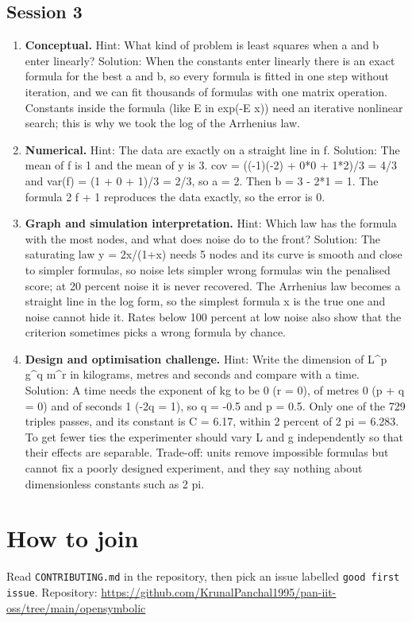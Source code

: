 \documentclass[11pt,a4paper]{article}
\begin{document}
\subsection*{Session 3}
\begin{enumerate}[nosep]
\item \textbf{Conceptual.} Hint: What kind of problem is least squares when a and b enter linearly? Solution: When the constants enter linearly there is an exact formula for the best a and b, so every formula is fitted in one step without iteration, and we can fit thousands of formulas with one matrix operation. Constants inside the formula (like E in exp(-E x)) need an iterative nonlinear search; this is why we took the log of the Arrhenius law.
\item \textbf{Numerical.} Hint: The data are exactly on a straight line in f. Solution: The mean of f is 1 and the mean of y is 3. cov = ((-1)(-2) + 0*0 + 1*2)/3 = 4/3 and var(f) = (1 + 0 + 1)/3 = 2/3, so a = 2. Then b = 3 - 2*1 = 1. The formula 2 f + 1 reproduces the data exactly, so the error is 0.
\item \textbf{Graph and simulation interpretation.} Hint: Which law has the formula with the most nodes, and what does noise do to the front? Solution: The saturating law y = 2x/(1+x) needs 5 nodes and its curve is smooth and close to simpler formulas, so noise lets simpler wrong formulas win the penalised score; at 20 percent noise it is never recovered. The Arrhenius law becomes a straight line in the log form, so the simplest formula x is the true one and noise cannot hide it. Rates below 100 percent at low noise also show that the criterion sometimes picks a wrong formula by chance.
\item \textbf{Design and optimisation challenge.} Hint: Write the dimension of L\textasciicircum{}p g\textasciicircum{}q m\textasciicircum{}r in kilograms, metres and seconds and compare with a time. Solution: A time needs the exponent of kg to be 0 (r = 0), of metres 0 (p + q = 0) and of seconds 1 (-2q = 1), so q = -0.5 and p = 0.5. Only one of the 729 triples passes, and its constant is C = 6.17, within 2 percent of 2 pi = 6.283. To get fewer ties the experimenter should vary L and g independently so that their effects are separable. Trade-off: units remove impossible formulas but cannot fix a poorly designed experiment, and they say nothing about dimensionless constants such as 2 pi.
\end{enumerate}

\section{How to join}
Read \texttt{CONTRIBUTING.md} in the repository, then pick an issue labelled \texttt{good first issue}. Repository: \url{https://github.com/KrunalPanchal1995/pan-iit-oss/tree/main/opensymbolic}
\end{document}

